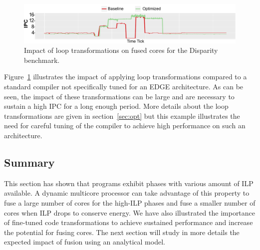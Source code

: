\begin{figure}[t]
    \includegraphics[width=\textwidth]{cases-paper/graphics/motivation/code_opt_3.pdf}
\vspace*{-5mm}
    \caption{Impact of loop transformations on fused cores for the Disparity benchmark.} 
    \label{fig:compmotiv}
\vspace{2mm}
\end{figure}
Figure~\ref{fig:compmotiv} illustrates the impact of applying loop transformations compared to a standard compiler not specifically tuned for an EDGE architecture.
As can be seen, the impact of these transformations can be large and are necessary to sustain a high IPC for a long enough period.
More details about the loop transformations are given in section~\ref{sec:opt} but this example illustrates the need for careful tuning of the compiler to achieve high performance on such an architecture.

\subsection{Summary}
This section has shown that programs exhibit phases with various amount of ILP available.
A dynamic multicore processor can take advantage of this property to fuse a large number of cores for the high-ILP phases and fuse a smaller number of cores when ILP drops to conserve energy.
We have also illustrated the importance of fine-tuned code transformations to achieve sustained performance and increase the potential for fusing cores.
The next section will study in more details the expected impact of fusion using an analytical model.

